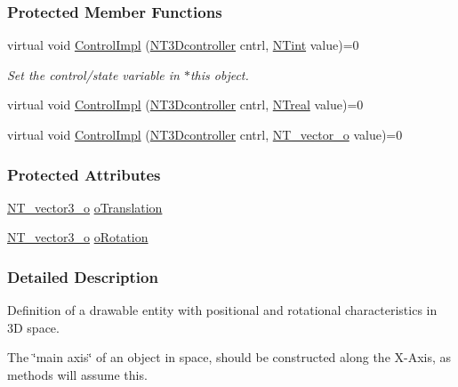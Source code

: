 \subsubsection*{Protected Member Functions}
\begin{DoxyCompactItemize}
\item 
virtual void \hyperlink{class_n_t3_d__object__o_a996d4d2d5d9565b45c1bc83da42ed9cb}{ControlImpl} (\hyperlink{nt3d__object__obj_8h_ae59ecf13a3631bc4a9ea41f90de08351}{NT3Dcontroller} cntrl, \hyperlink{nt__types_8h_aee8aa0a9869e8b5c97c6c02217ff09cd}{NTint} value)=0
\begin{DoxyCompactList}\small\item\em Set the control/state variable in $\ast$this object. \item\end{DoxyCompactList}\item 
virtual void \hyperlink{class_n_t3_d__object__o_a115c0ad284e4b2033ad73a0210355453}{ControlImpl} (\hyperlink{nt3d__object__obj_8h_ae59ecf13a3631bc4a9ea41f90de08351}{NT3Dcontroller} cntrl, \hyperlink{nt__types_8h_a814a97893e9deb1eedcc7604529ba80d}{NTreal} value)=0
\item 
virtual void \hyperlink{class_n_t3_d__object__o_a9e31e38714993ecf9a547c332e6a1a1c}{ControlImpl} (\hyperlink{nt3d__object__obj_8h_ae59ecf13a3631bc4a9ea41f90de08351}{NT3Dcontroller} cntrl, \hyperlink{class_n_t__vector__o}{NT\_\-vector\_\-o} value)=0
\end{DoxyCompactItemize}
\subsubsection*{Protected Attributes}
\begin{DoxyCompactItemize}
\item 
\hyperlink{class_n_t__vector3__o}{NT\_\-vector3\_\-o} \hyperlink{class_n_t3_d__object__o_af5d9c0d7ed45790f4c26c285d6c72038}{oTranslation}
\item 
\hyperlink{class_n_t__vector3__o}{NT\_\-vector3\_\-o} \hyperlink{class_n_t3_d__object__o_a0a2527d331d36e40cfcbadc77c87f749}{oRotation}
\end{DoxyCompactItemize}


\subsubsection{Detailed Description}
Definition of a drawable entity with positional and rotational characteristics in 3D space.

The \char`\"{}main axis\char`\"{} of an object in space, should be constructed along the X-\/Axis, as methods will assume this. 

